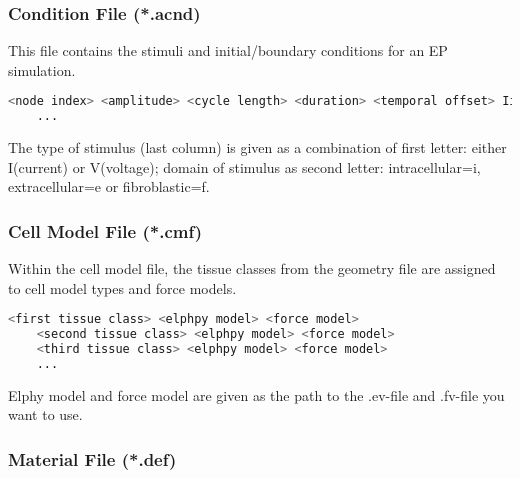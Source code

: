 \subsubsection{Condition File (*.acnd)}
\label{files:condition}

This file contains the stimuli and initial/boundary conditions for an EP simulation.
\begin{lstlisting}[language=Bash,caption=acCELLerate condition file (*.acnd)]
    <node index> <amplitude> <cycle length> <duration> <temporal offset> Ii|Ie|If|Vm|Ve|Vf
    ...
\end{lstlisting}
The type of stimulus (last column) is given as a combination of first letter: either I(current) or V(voltage); domain of stimulus as second letter: intracellular=i, extracellular=e or fibroblastic=f.

\subsubsection{Cell Model File (*.cmf)}
\label{files:cellmodel}

Within the cell model file, the tissue classes from the geometry file are assigned to cell model types and force models.
\begin{lstlisting}[language=Bash,caption=acCELLerate cell model file (*.cmf)]
    <first tissue class> <elphpy model> <force model>
    <second tissue class> <elphpy model> <force model>
    <third tissue class> <elphpy model> <force model>
    ...
\end{lstlisting}
Elphy model and force model are given as the path to the .ev-file and .fv-file you want to use.

\subsubsection{Material File (*.def)}
\label{files:material}


